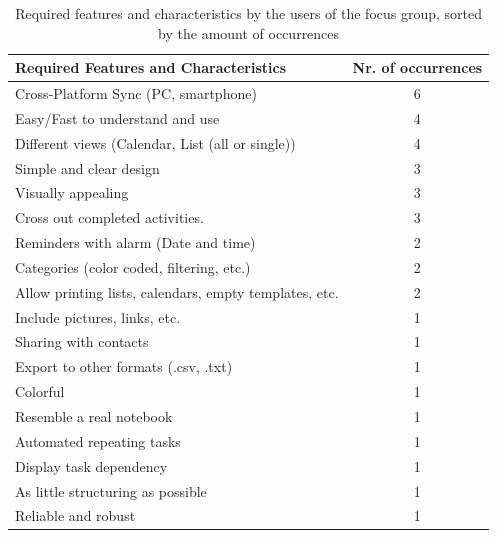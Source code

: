 \FloatBarrier
\begin{table}[!htbp]
    \centering
    \begin{tabular}{|l|l|}
        \hline
        \textbf{Required Features and Characteristics}         & \textbf{Nr. of occurrences} \\ \hline
        Cross-Platform Sync (PC, smartphone)                   & \multicolumn{1}{c|}{6} \\ \hline
        Easy/Fast to understand and use                        & \multicolumn{1}{c|}{4} \\ \hline
        Different views (Calendar, List (all or single))       & \multicolumn{1}{c|}{4} \\ \hline
        Simple and clear design                                & \multicolumn{1}{c|}{3} \\ \hline
        Visually appealing                                     & \multicolumn{1}{c|}{3} \\ \hline
        Cross out completed activities.                        & \multicolumn{1}{c|}{3} \\ \hline
        Reminders with alarm (Date and time)                   & \multicolumn{1}{c|}{2} \\ \hline
        Categories (color coded, filtering, etc.)              & \multicolumn{1}{c|}{2} \\ \hline
        Allow printing lists, calendars, empty templates, etc. & \multicolumn{1}{c|}{2} \\ \hline
        Include pictures, links, etc.                          & \multicolumn{1}{c|}{1} \\ \hline
        Sharing with contacts                                  & \multicolumn{1}{c|}{1} \\ \hline
        Export to other formats (.csv, .txt)                   & \multicolumn{1}{c|}{1} \\ \hline
        Colorful                                               & \multicolumn{1}{c|}{1} \\ \hline
        Resemble a real notebook                               & \multicolumn{1}{c|}{1} \\ \hline
        Automated repeating tasks                              & \multicolumn{1}{c|}{1} \\ \hline
        Display task dependency                                & \multicolumn{1}{c|}{1} \\ \hline
        As little structuring as possible                      & \multicolumn{1}{c|}{1} \\ \hline
        Reliable and robust                                    & \multicolumn{1}{c|}{1} \\ \hline
    \end{tabular}
    \caption{Required features and characteristics by the users of the focus group, sorted by the amount of occurrences}
    \label{tab:reqFeaturesTable}
\end{table}
\FloatBarrier

